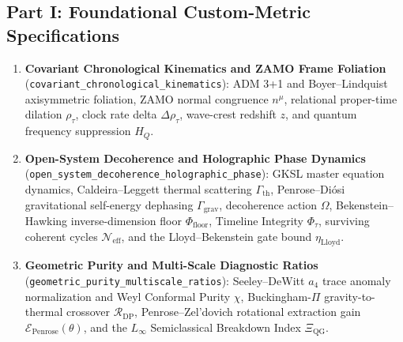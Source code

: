 \documentclass[11pt,a4paper]{article}
\begin{document}
\subsection*{Part I: Foundational Custom-Metric Specifications}
\begin{enumerate}
    \item \textbf{Covariant Chronological Kinematics and ZAMO Frame Foliation} (\texttt{covariant\_chronological\_kinematics}): ADM 3+1 and Boyer--Lindquist axisymmetric foliation, ZAMO normal congruence $n^\mu$, relational proper-time dilation $\rho_\tau$, clock rate delta $\Delta\rho_\tau$, wave-crest redshift $z$, and quantum frequency suppression $H_Q$.
    \item \textbf{Open-System Decoherence and Holographic Phase Dynamics} (\texttt{open\_system\_decoherence\_holographic\_phase}): GKSL master equation dynamics, Caldeira--Leggett thermal scattering $\Gamma_{\mathrm{th}}$, Penrose--Di\'osi gravitational self-energy dephasing $\Gamma_{\mathrm{grav}}$, decoherence action $\Omega$, Bekenstein--Hawking inverse-dimension floor $\Phi_{\mathrm{floor}}$, Timeline Integrity $\Phi_\tau$, surviving coherent cycles $\mathcal{N}_{\mathrm{eff}}$, and the Lloyd--Bekenstein gate bound $\eta_{\mathrm{Lloyd}}$.
    \item \textbf{Geometric Purity and Multi-Scale Diagnostic Ratios} (\texttt{geometric\_purity\_multiscale\_ratios}): Seeley--DeWitt $a_4$ trace anomaly normalization and Weyl Conformal Purity $\chi$, Buckingham-$\Pi$ gravity-to-thermal crossover $\mathcal{R}_{\mathrm{DP}}$, Penrose--Zel'dovich rotational extraction gain $\mathcal{E}_{\mathrm{Penrose}}(\theta)$, and the $L_\infty$ Semiclassical Breakdown Index $\Xi_{\mathrm{QG}}$.
\end{enumerate}
\end{document}

